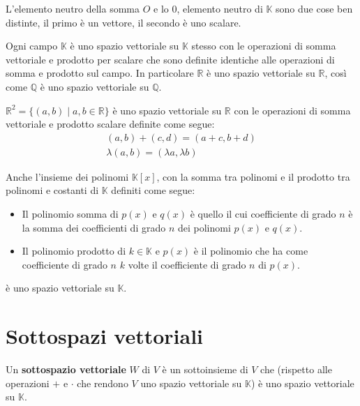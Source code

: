 \begin{observation}
	L'elemento neutro della somma $O$ e lo $0$, elemento neutro di $\mathbb{K}$
	sono due cose ben distinte, il primo è un vettore, il secondo è uno scalare.
\end{observation}

\begin{example}
	Ogni campo $\mathbb{K}$ \`e uno spazio vettoriale su $\mathbb{K}$
	stesso con le operazioni di somma vettoriale e prodotto per scalare
	che sono definite identiche alle operazioni di somma e prodotto sul
	campo. In particolare $\mathbb{R}$ \`e uno spazio vettoriale
	su $\mathbb{R}$, cos\`i come $\mathbb{Q}$ \`e uno spazio vettoriale
	su $\mathbb{Q}$.
\end{example}

\begin{example}
	$\mathbb{R}^2 = \{(a, b) \mid a,b \in \mathbb{R}\}$ \`e uno spazio
	vettoriale su $\mathbb{R}$ con le operazioni di somma vettoriale
	e prodotto scalare definite come segue:
	\begin{gather*}
		(a,b) + (c,d) = (a + c, b + d) \\
		\lambda (a, b) = (\lambda a, \lambda b)
	\end{gather*}
\end{example}

\begin{example}
	Anche l'insieme dei polinomi $\mathbb{K}[x]$, con la somma tra
	polinomi e il prodotto tra polinomi e costanti di $\mathbb{K}$
	definiti come segue:
	\begin{itemize}
		\item
		      Il polinomio somma di $p(x)$ e $q(x)$ \`e quello il cui
		      coefficiente di grado $n$ \`e la somma dei coefficienti di grado
		      $n$ dei polinomi $p(x)$ e $q(x)$.
		\item
		      Il polinomio prodotto di $k \in \mathbb{K}$ e $p(x)$ \`e il
		      polinomio che ha come coefficiente di grado $n$ $k$ volte il
		      coefficiente di grado $n$ di $p(x)$.
	\end{itemize}
	\`e uno spazio vettoriale su $\mathbb{K}$.
\end{example}

\section{Sottospazi vettoriali}

\begin{defn}
	Un \textbf{sottospazio vettoriale} $W$ di $V$ \`e un sottoinsieme di $V$
	che (rispetto alle operazioni $+$ e $\cdot$ che rendono $V$
	uno spazio vettoriale su $\mathbb{K}$) \`e uno spazio
	vettoriale su $\mathbb{K}$.
\end{defn}

